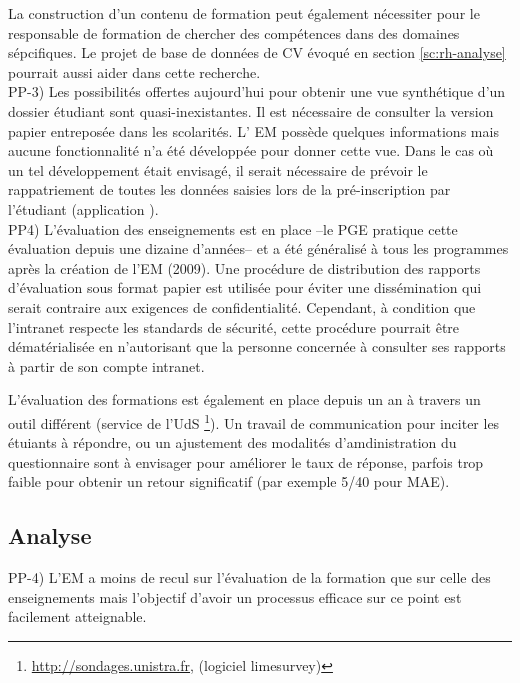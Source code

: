 \documentclass{book}
\begin{document}
La construction d'un contenu de formation peut également nécessiter pour le 
responsable de formation de chercher des compétences dans des domaines sépcifiques. 
Le projet de base de données de CV évoqué en section \ref{sc:rh-analyse} pourrait 
aussi aider dans cette recherche.\\



PP-3) Les possibilités offertes aujourd'hui pour obtenir une vue synthétique
d'un dossier étudiant sont quasi-inexistantes. Il est nécessaire de consulter 
la version papier entreposée dans les scolarités. L' EM 
 possède quelques informations mais aucune fonctionnalité n'a été développée
pour donner cette vue. Dans le cas où un tel développement était envisagé,
il serait nécessaire de prévoir le rappatriement de toutes les données 
saisies lors de la pré-inscription par l'étudiant (application ).\\


PP4) L'évaluation des enseignements est en place --le PGE pratique cette évaluation 
depuis  une dizaine d'années-- et a été généralisé à tous les programmes après
la création de l'EM (2009). Une procédure de distribution des rapports d'évaluation
sous format papier est utilisée pour éviter une dissémination qui serait contraire
aux exigences de confidentialité. Cependant, à condition que l'intranet respecte 
les standards de sécurité, cette procédure pourrait être dématérialisée en n'autorisant
que la personne concernée à consulter ses rapports à partir de son compte intranet.

L'évaluation des formations est également en place depuis un an à travers 
un outil différent (service de l'UdS%
 \footnote{\url{http://sondages.unistra.fr}, (logiciel limesurvey)}).
Un travail de communication pour inciter les étuiants à répondre, ou un ajustement 
des modalités d'amdinistration du questionnaire sont à envisager pour améliorer
le taux de réponse, parfois trop faible pour obtenir un retour significatif (par
exemple 5/40 pour MAE).
\\



\subsection{Analyse}


PP-4)
L'EM a moins de recul sur l'évaluation de la formation que sur celle des enseignements
mais l'objectif d'avoir un processus efficace sur ce point est facilement atteignable.
\end{document}
